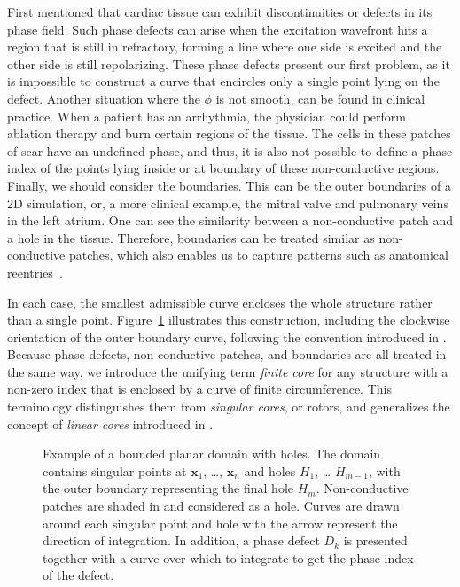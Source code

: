 \documentclass[twocolumn]{article}
\begin{document}
First \textcite{arno2021a, tomii2021spatial} mentioned
that cardiac tissue can exhibit discontinuities or defects in its phase field.
Such phase defects can arise when the excitation wavefront hits a region
that is still in refractory,
forming a line where one side is excited and the other side is still repolarizing.
These phase defects present our first problem,
as it is impossible to construct a curve
that encircles only a single point lying on the defect.
Another situation where the $\phi$ is not smooth,
can be found in clinical practice.
When a patient has an arrhythmia,
the physician could perform ablation therapy and burn certain regions of the tissue.
The cells in these patches of scar have an undefined phase, and thus,
it is also not possible to define a phase index of the points
lying inside or at boundary of these non-conductive regions.
Finally, we should consider the boundaries.
This can be the outer boundaries of a 2D simulation,
or, a more clinical example, the mitral valve and pulmonary veins in the left atrium.
One can see the similarity between a non-conductive patch and a hole in the tissue.
Therefore, boundaries can be treated similar as non-conductive patches,
which also enables us to capture patterns such as anatomical reentries~\autocite{duytschaever2024atrial}.

In each case, the smallest admissible curve encloses the whole structure
rather than a single point.
Figure~\ref{fig:index_calculation} illustrates this construction,
including the clockwise orientation of the outer boundary curve,
following the convention introduced in \textcite{davidsen2004topological}.
Because phase defects, non-conductive patches, and boundaries are all treated
in the same way, we introduce the unifying term \emph{finite core} for any
structure with a non-zero index that is enclosed by a curve of finite
circumference. This terminology distinguishes them from \emph{singular cores}, or rotors,
and generalizes the concept of \emph{linear cores} introduced in \textcite{arno2021a}.

\begin{figure}[ht]
  \centering
  \caption{Example of a bounded planar domain with holes. The domain
    contains singular points at \(\pmb{x}_1\), \ldots, \(\pmb{x}_n\) and
    holes \(H_1\), \ldots{} \(H_{m-1}\), with the outer boundary
    representing the final hole \(H_m\).
    Non-conductive patches are shaded in and considered as a hole.
    Curves are drawn around each singular point and hole
    with the arrow represent the direction of integration.
    In addition, a phase defect $D_k$ is presented
    together with a curve over which to integrate to get the phase index of the defect.
  }
  \label{fig:index_calculation}
\end{figure}
\end{document}
